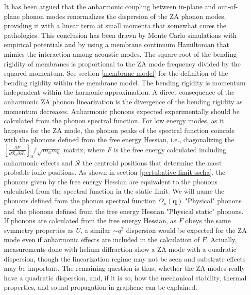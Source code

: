It has been argued\cite{wang2016anharmonic,los2009scaling,katsnelson2013graphene,zakharchenko2009finite,mariani2008flexural,amorim2014thermodynamics,de2012bending} that the anharmonic coupling between in-plane and out-of-plane phonon 
modes renormalizes the dispersion of the ZA phonon modes, providing it with a linear term at small momenta that 
somewhat cures the pathologies. This conclusion has been drawn by Monte Carlo simulations with empirical 
potentials\cite{wang2016anharmonic,los2009scaling,katsnelson2013graphene,zakharchenko2009finite} and by using a 
membrane continuum  Hamiltonian that mimics the interaction among acoustic 
modes\cite{mariani2008flexural,amorim2014thermodynamics,de2012bending}. 
The square root of the bending rigidity of membranes is proportional to the ZA mode frequency divided by the 
squared momentum. See section \ref{membrane-model} for the definition of the bending rigidity within the membrane 
model. The bending rigidity is momentum independent within the harmonic approximation. A direct consequence of the 
anharmonic ZA phonon linearization is the divergence of the bending rigidity as momentum decreases. 
Anharmonic phonons expected experimentally 
should be calculated from the phonon spectral function. For low energy modes, as it happens for the ZA mode, the 
phonon peaks of the spectral function coincide with the phonons defined from the
free energy Hessian, i.e., diagonalizing the  $[\frac{\partial F}{\partial \mathcal{R}_a \partial \mathcal{R}_b}]_{0}/\sqrt{m_am_b}$ matrix, where $F$ is the free energy calculated including anharmonic 
effects and $\boldsymbol{\mathcal{R}}$ the centroid positions that determine the most probable ionic 
positions\cite{bianco2017second}. As shown in section \ref{pertubative-limit-sscha}, the phonons given by the free 
energy Hessian are equivalent to the phonons calculated from the spectral function in the static limit. We will name 
the phonons defined from the phonon spectral function $\Omega_{\mu}(\boldsymbol{q})$ "Physical" phonons and the 
phonons defined from the free energy Hessian "Physical static" phonons. 
If phonons are calculated from the free energy Hessian, as $F$ obeys the same symmetry properties as $U$, a similar 
$\sim q^2$ dispersion would be expected for the ZA mode even if anharmonic effects are included in the calculation 
of $F$. Actually, measurements done with helium diffraction show a ZA mode with a quadratic 
dispersion\cite{al2016acoustic,al2015helium,al2018resolving}, though the linearization regime may not be seen and 
substrate effects may be important. The remaining question is thus, whether the ZA modes really have a quadratic 
dispersion, and, if it is so, how the mechanical stability, thermal properties, and sound propagation in graphene 
can be explained. \\

